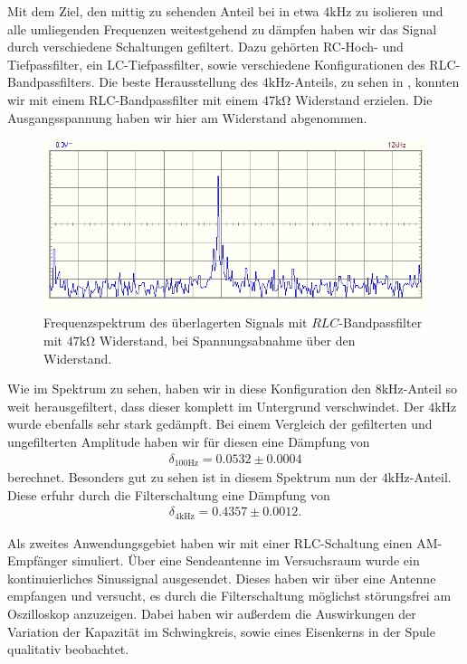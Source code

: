 Mit dem Ziel, den mittig zu sehenden Anteil bei in etwa $4\si{\kilo\hertz}$ zu isolieren und alle umliegenden Frequenzen weitestgehend zu dämpfen haben wir das Signal durch verschiedene Schaltungen gefiltert. Dazu gehörten RC-Hoch- und Tiefpassfilter, ein LC-Tiefpassfilter, sowie verschiedene Konfigurationen des RLC-Bandpassfilters. Die beste Herausstellung des $4\si{\kilo\hertz}$-Anteils, zu sehen in , konnten wir mit einem RLC-Bandpassfilter mit einem $47\si{\kilo\ohm}$ Widerstand erzielen. Die Ausgangsspannung haben wir hier am Widerstand abgenommen.

\begin{figure}[H]
  \centering
  \includegraphics[width=.8\textwidth]{files/aufgabe8_teil3_clR_47ohm_bandpass_spectrum.png}
  \caption{Frequenzspektrum des überlagerten Signals mit $RLC$-Bandpassfilter mit $47\si{\kilo\ohm}$ Widerstand, bei Spannungsabnahme über den Widerstand.}
  \label{fig:zsmf_aufgabe8_teil3_clR_47ohm_bandpass}
\end{figure}

Wie im Spektrum zu sehen, haben wir in diese Konfiguration den $8\si{\kilo\hertz}$-Anteil so weit herausgefiltert, dass dieser komplett im Untergrund verschwindet. Der $4\si{\kilo\hertz}$ wurde ebenfalls sehr stark gedämpft. Bei einem Vergleich der gefilterten und ungefilterten Amplitude haben wir für diesen eine Dämpfung von
\begin{align*}
  \delta_{100\si{\hertz}} = 0.0532 \pm 0.0004
\end{align*}
berechnet. Besonders gut zu sehen ist in diesem Spektrum nun der $4\si{\kilo\hertz}$-Anteil. Diese erfuhr durch die Filterschaltung eine Dämpfung von
\begin{align*}
  \delta_{4\si{\kilo\hertz}} = 0.4357 \pm 0.0012.
\end{align*}

Als zweites Anwendungsgebiet haben wir mit einer RLC-Schaltung einen AM-Empfänger simuliert. Über eine Sendeantenne im Versuchsraum wurde ein kontinuierliches Sinussignal ausgesendet. Dieses haben wir über eine Antenne empfangen und versucht, es durch die Filterschaltung möglichst störungsfrei am Oszilloskop anzuzeigen. Dabei haben wir außerdem die Auswirkungen der Variation der Kapazität im Schwingkreis, sowie eines Eisenkerns  in der Spule qualitativ beobachtet.

